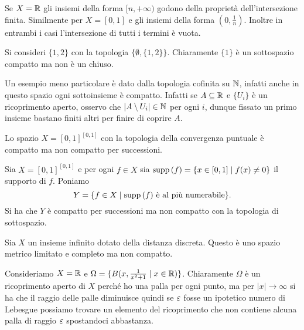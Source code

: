 \begin{multicols*}{2}
\begin{example}\label{EsempioIntersezioneFinita}
Se $X=\mathbb{R}$ gli insiemi della forma $[n,+\infty)$ godono della propriet\`a dell'intersezione finita. Similmente per $X=[0,1]$ e gli insiemi della forma $(0,\frac1n)$. Inoltre in entrambi i casi l'intersezione di tutti i termini \`e vuota.
\end{example}

\begin{example}\label{SottoinsiemeCompattoNonChiuso}
Si consideri $\{1,2\}$ con la topologia $\{\emptyset, \{1,2\}\}$. Chiaramente $\{1\}$ \`e un sottospazio compatto ma non \`e un chiuso.


Un esempio meno particolare \`e dato dalla topologia cofinita su $\mathbb{N}$, infatti anche in questo spazio ogni sottoinsieme \`e compatto. Infatti se $A\subseteq \mathbb{R}$ e $\{U_i\}$ \`e un ricoprimento aperto, osservo che $|A\setminus U_{i}|\in\mathbb{N}$ per ogni $i$, dunque fissato un primo insieme bastano finiti altri per finire di coprire $A$.
\end{example}

\begin{example}\label{CompattoNonCompattoPerSuccessioni}
Lo spazio $X=[0,1]^{[0,1]}$ con la topologia della convergenza puntuale \`e compatto ma non compatto per successioni.
\end{example}
\begin{example}\label{CompattoPerSuccessioniNonCompatto}
Sia $X=[0,1]^{[0,1]}$ e per ogni $f\in X$ sia $\mathrm{supp}\,(f)=\{x\in [0,1]\mid f(x)\neq0\}$ il supporto di $f$. Poniamo
\[Y=\{f\in X\mid \mathrm{supp}\,(f)\text{ \`e al pi\`u numerabile}\}.\]
Si ha che $Y$ \`e compatto per successioni ma non compatto con la topologia di sottospazio.
\end{example}

\begin{example}\label{LimiatoCompletoNonCompatto}
Sia $X$ un insieme infinito dotato della distanza discreta. Questo \`e uno spazio metrico limitato e completo ma non compatto.
\end{example}

\begin{example}\label{RicoprimentoSenzaNumeroDiLebesgue}
Consideriamo $X=\mathbb{R}$ e $\Omega=\{B(x,\frac1{x^2+1}\mid x\in \mathbb{R})\}$. Chiaramente $\Omega$ \`e un ricoprimento aperto di $X$ perch\'e ho una palla per ogni punto, ma per $|x|\to\infty$ si ha che il raggio delle palle diminuisce quindi se $\varepsilon$ fosse un ipotetico numero di Lebesgue possiamo trovare un elemento del ricoprimento che non contiene alcuna palla di raggio $\varepsilon$ spostandoci abbastanza.
\end{example}


\end{multicols*}

